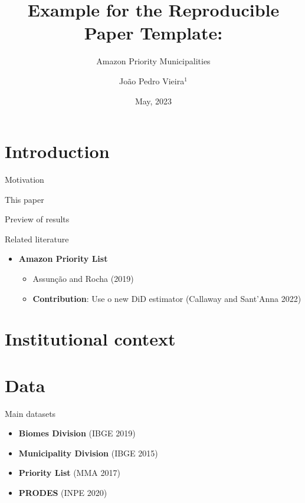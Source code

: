 \documentclass[
  ignorenonframetext,
  aspectratio=169]{beamer}
\title{Example for the Reproducible Paper Template:}
\subtitle{Amazon Priority Municipalities}
\author{João Pedro Vieira\(^1\)}
\date{May, 2023}
\institute{\(^1\)PUC-Rio}
\providecommand{\tightlist}{%
  \setlength{\itemsep}{0pt}\setlength{\parskip}{0pt}}
\begin{document}
\frame{\titlepage}

\hypertarget{introduction}{%
\section{Introduction}\label{introduction}}

\begin{frame}{Motivation}
\protect\hypertarget{motivation}{}
\label{motivation}
\end{frame}

\begin{frame}{This paper}
\protect\hypertarget{this-paper}{}
\label{thisPaper}
\end{frame}

\begin{frame}{Preview of results}
\protect\hypertarget{preview-of-results}{}
\label{previewResults}
\end{frame}

\begin{frame}{Related literature}
\protect\hypertarget{related-literature}{}
\begin{itemize}
\tightlist
\item
  \textbf{Amazon Priority List}

  \begin{itemize}
  \tightlist
  \item
    \begingroup \footnotesize\color{gray} Assunção and Rocha (2019)
    \endgroup
  \item
    \textbf{Contribution}: Use o new DiD estimator (Callaway and
    Sant'Anna 2022)
  \end{itemize}
\end{itemize}
\end{frame}

\hypertarget{institutional-context}{%
\section{Institutional context}\label{institutional-context}}

\hypertarget{data}{%
\section{Data}\label{data}}

\begin{frame}{Main datasets}
\protect\hypertarget{main-datasets}{}
\begin{itemize}
\item
  \textbf{Biomes Division} (IBGE 2019)
\item
  \textbf{Municipality Division} (IBGE 2015)
\item
  \textbf{Priority List} (MMA 2017)
\item
  \textbf{PRODES} (INPE 2020)
\end{itemize}
\end{frame}
\end{document}
